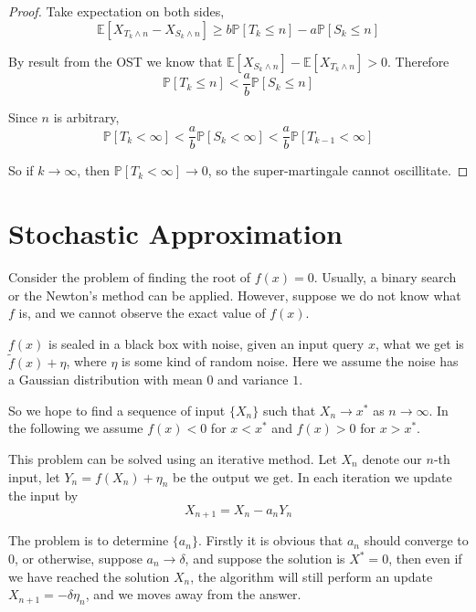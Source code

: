 \begin{proof}
        Take expectation on both sides,
        \[ \mathbb{E}[X_{T_k \wedge n} - X_{S_k \wedge n}] \ge b\mathbb{P}[T_k \le n] - a\mathbb{P}[S_k \le n] \]

        By result from the OST we know that $\mathbb{E}[X_{S_k \wedge n}] - \mathbb{E}[X_{T_k \wedge n}] > 0$. Therefore
        \[ \mathbb{P}[T_k \le n] < \frac{a}{b}\mathbb{P}[S_k \le n] \]

        Since $n$ is arbitrary,
        \[ \mathbb{P}[T_k < \infty] < \frac{a}{b}\mathbb{P}[S_k < \infty] < \frac{a}{b}\mathbb{P}[T_{k-1} < \infty] \]

        So if $k \to \infty$, then $\mathbb{P}[T_k < \infty] \to 0$, so the super-martingale cannot oscillitate.
    \end{proof}


\section{Stochastic Approximation}
    Consider the problem of finding the root of $f(x)=0$. Usually, a binary search or the Newton's method can be applied. However, suppose we do not know what $f$ is, and we cannot observe the exact value of $f(x)$.

    $f(x)$ is sealed in a black box with noise, given an input query $x$, what we get is $\tilde{f}(x) + \eta$, where $\eta$ is some kind of random noise. Here we assume the noise has a Gaussian distribution with mean $0$ and variance $1$.

    So we hope to find a sequence of input $\{X_n\}$ such that $X_n \to x^*$ as $n \to \infty$. In the following we assume $f(x)<0$ for $x < x^*$ and $f(x)>0$ for $x>x^*$.

    This problem can be solved using an iterative method. Let $X_n$ denote our $n$-th input, let $Y_n = f(X_n) + \eta_n$ be the output we get. In each iteration we update the input by
    \[ X_{n+1} = X_n - a_nY_n \]

    The problem is to determine $\{a_n\}$. Firstly it is obvious that $a_n$ should converge to $0$, or otherwise, suppose $a_n \to \delta$, and suppose the solution is $X^* = 0$, then even if we have reached the solution $X_n$, the algorithm will still perform an update $X_{n+1} = -\delta \eta_n$, and we moves away from the answer.

